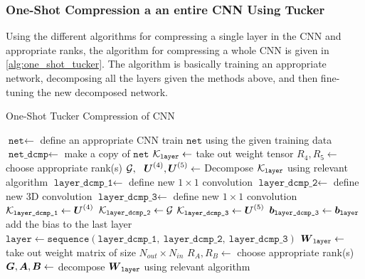 \subsubsection{One-Shot Compression a an entire CNN Using Tucker}
Using the different algorithms for compressing a single layer in the CNN and appropriate ranks, the algorithm for compressing a whole CNN is given in \autoref{alg:one_shot_tucker}. The algorithm is basically training an appropriate network, decomposing all the layers given the methods above, and then fine-tuning the new decomposed network.

\begin{algorithm} \caption{One-Shot Tucker Compression of CNN} \label{alg:one_shot_tucker}
\begin{algorithmic}[1]
    \State $\texttt{net} \leftarrow $ define an appropriate CNN
    \State train $\texttt{net}$ using the given training data
    \State $\texttt{net\_dcmp} \leftarrow $ make a copy of $\texttt{net}$
        \State $\mathcal{K}_{\texttt{layer}} \leftarrow $ take out weight tensor
        \State $R_4, R_5 \leftarrow$ choose appropriate rank(s)
        \State $\tensor{G}, \ \ \bs{U}^{(4)}, \bs{U}^{(5)} \leftarrow $ Decompose $\mathcal{K}_{\texttt{layer}}$ using relevant algorithm 
        \State $\texttt{layer\_dcmp\_1} \leftarrow $ define new $1\times 1$ convolution 
        \State $\texttt{layer\_dcmp\_2} \leftarrow $ define new 3D convolution
        \State $\texttt{layer\_dcmp\_3} \leftarrow $ define new $1\times 1$ convolution 
        \State $\mathcal{K}_{\texttt{layer\_dcmp\_1}} \leftarrow \boldsymbol{U}^{(4)}$ 
        \State $\mathcal{K}_{\texttt{layer\_dcmp\_2}} \leftarrow \mathcal{G}$
        \State $\mathcal{K}_{\texttt{layer\_dcmp\_3}} \leftarrow \boldsymbol{U}^{(5)}$ 
        \State $\boldsymbol{b}_{\texttt{layer\_dcmp\_3}} \leftarrow \boldsymbol{b}_{\texttt{layer}}$ add the bias to the last layer 
        \State $\texttt{layer} \leftarrow \texttt{sequence}(\texttt{layer\_dcmp\_1}, \  \texttt{layer\_dcmp\_2}, \ \texttt{layer\_dcmp\_3})$
    \EndFor
        \State $\boldsymbol{W}_{\texttt{layer}} \leftarrow $ take out weight matrix of size $N_{out} \times N_{in}$
        \State $R_A, R_B \leftarrow $ choose appropriate rank(s)
        \State $\boldsymbol{G}, \boldsymbol{A}, \boldsymbol{B} \leftarrow $ decompose $\boldsymbol{W}_{\texttt{layer}}$ using relevant algorithm 

\end{algorithmic}
\end{algorithm}
